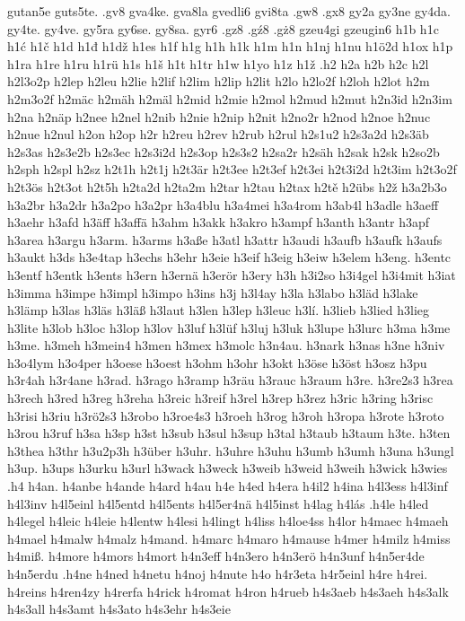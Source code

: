 gutan5e
guts5te.
.gv8
gva4ke.
gva8la
gvedli6
gvi8ta
.gw8
.gx8
gy2a
gy3ne
gy4da.
gy4te.
gy4ve.
gy5ra
gy6se.
gy8sa.
gyr6
.gz8
.gź8
.gż8
gzeu4gi
gzeugin6
h1b
h1c
h1ć
h1č
h1d
h1đ
h1dž
h1es
h1f
h1g
h1h
h1k
h1m
h1n
h1nj
h1nu
h1ö2d
h1ox
h1p
h1ra
h1re
h1ru
h1rü
h1s
h1š
h1t
h1tr
h1w
h1yo
h1z
h1ž
.h2
h2a
h2b
h2c
h2l
h2l3o2p
h2lep
h2leu
h2lie
h2lif
h2lim
h2lip
h2lit
h2lo
h2lo2f
h2loh
h2lot
h2m
h2m3o2f
h2mäc
h2mäh
h2mäl
h2mid
h2mie
h2mol
h2mud
h2mut
h2n3id
h2n3im
h2na
h2näp
h2nee
h2nel
h2nib
h2nie
h2nip
h2nit
h2no2r
h2nod
h2noe
h2nuc
h2nue
h2nul
h2on
h2op
h2r
h2reu
h2rev
h2rub
h2rul
h2s1u2
h2s3a2d
h2s3äb
h2s3as
h2s3e2b
h2s3ec
h2s3i2d
h2s3op
h2s3s2
h2sa2r
h2säh
h2sak
h2sk
h2so2b
h2sph
h2spl
h2sz
h2t1h
h2t1j
h2t3är
h2t3ee
h2t3ef
h2t3ei
h2t3i2d
h2t3im
h2t3o2f
h2t3ös
h2t3ot
h2t5h
h2ta2d
h2ta2m
h2tar
h2tau
h2tax
h2tě
h2übs
h2ž
h3a2b3o
h3a2br
h3a2dr
h3a2po
h3a2pr
h3a4blu
h3a4mei
h3a4rom
h3ab4l
h3adle
h3aeff
h3aehr
h3afd
h3äff
h3affä
h3ahm
h3akk
h3akro
h3ampf
h3anth
h3antr
h3apf
h3area
h3argu
h3arm.
h3arms
h3aße
h3atl
h3attr
h3audi
h3aufb
h3aufk
h3aufs
h3aukt
h3ds
h3e4tap
h3echs
h3ehr
h3eie
h3eif
h3eig
h3eiw
h3elem
h3eng.
h3entc
h3entf
h3entk
h3ents
h3ern
h3ernä
h3erör
h3ery
h3h
h3i2so
h3i4gel
h3i4mit
h3iat
h3imma
h3impe
h3impl
h3impo
h3ins
h3j
h3l4ay
h3la
h3labo
h3läd
h3lake
h3lämp
h3las
h3läs
h3läß
h3laut
h3len
h3lep
h3leuc
h3lí.
h3lieb
h3lied
h3lieg
h3lite
h3lob
h3loc
h3lop
h3lov
h3luf
h3lüf
h3luj
h3luk
h3lupe
h3lurc
h3ma
h3me
h3me.
h3meh
h3mein4
h3men
h3mex
h3molc
h3n4au.
h3nark
h3nas
h3ne
h3niv
h3o4lym
h3o4per
h3oese
h3oest
h3ohm
h3ohr
h3okt
h3öse
h3öst
h3osz
h3pu
h3r4ah
h3r4ane
h3rad.
h3rago
h3ramp
h3räu
h3rauc
h3raum
h3re.
h3re2s3
h3rea
h3rech
h3red
h3reg
h3reha
h3reic
h3reif
h3rel
h3rep
h3rez
h3ric
h3ring
h3risc
h3risi
h3riu
h3rö2s3
h3robo
h3roe4s3
h3roeh
h3rog
h3roh
h3ropa
h3rote
h3roto
h3rou
h3ruf
h3sa
h3sp
h3st
h3sub
h3sul
h3sup
h3tal
h3taub
h3taum
h3te.
h3ten
h3thea
h3thr
h3u2p3h
h3über
h3uhr.
h3uhre
h3uhu
h3umb
h3umh
h3una
h3ungl
h3up.
h3ups
h3urku
h3url
h3wack
h3weck
h3weib
h3weid
h3weih
h3wick
h3wies
.h4
h4an.
h4anbe
h4ande
h4ard
h4au
h4e
h4ed
h4era
h4il2
h4ina
h4l3ess
h4l3inf
h4l3inv
h4l5einl
h4l5entd
h4l5ents
h4l5er4nä
h4l5inst
h4lag
h4lás
.h4le
h4led
h4legel
h4leic
h4leie
h4lentw
h4lesi
h4lingt
h4liss
h4loe4ss
h4lor
h4maec
h4maeh
h4mael
h4malw
h4malz
h4mand.
h4marc
h4maro
h4mause
h4mer
h4milz
h4miss
h4miß.
h4more
h4mors
h4mort
h4n3eff
h4n3ero
h4n3erö
h4n3unf
h4n5er4de
h4n5erdu
.h4ne
h4ned
h4netu
h4noj
h4nute
h4o
h4r3eta
h4r5einl
h4re
h4rei.
h4reins
h4ren4zy
h4rerfa
h4rick
h4romat
h4ron
h4rueb
h4s3aeb
h4s3aeh
h4s3alk
h4s3all
h4s3amt
h4s3ato
h4s3ehr
h4s3eie
